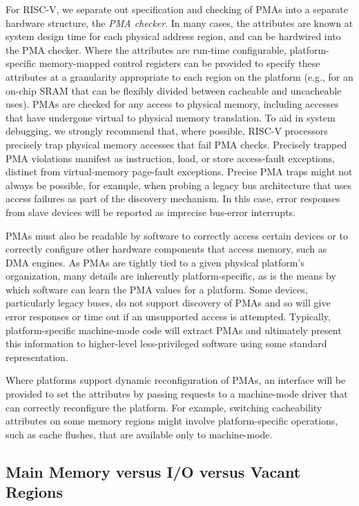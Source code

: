 For RISC-V, we separate out specification and checking of PMAs into a
separate hardware structure, the {\em PMA checker}.  In many cases,
the attributes are known at system design time for each physical
address region, and can be hardwired into the PMA checker.  Where the
attributes are run-time configurable, platform-specific memory-mapped
control registers can be provided to specify these attributes at a
granularity appropriate to each region on the platform (e.g., for an
on-chip SRAM that can be flexibly divided between cacheable and
uncacheable uses).  PMAs are checked for any access to physical
memory, including accesses that have undergone virtual to physical
memory translation.  To aid in system debugging, we strongly recommend
that, where possible, RISC-V processors precisely trap physical memory
accesses that fail PMA checks.  Precisely trapped PMA violations manifest
as instruction, load, or store access-fault exceptions, distinct from
virtual-memory page-fault exceptions. Precise PMA traps might not always be
possible, for example, when probing a legacy bus architecture that
uses access failures as part of the discovery mechanism.  In this
case, error responses from slave devices will be reported as imprecise
bus-error interrupts.

PMAs must also be readable by software to correctly access certain
devices or to correctly configure other hardware components that
access memory, such as DMA engines.  As PMAs are tightly tied to a
given physical platform's organization, many details are inherently
platform-specific, as is the means by which software can learn the PMA
values for a platform.  Some
devices, particularly legacy buses, do not support discovery of PMAs
and so will give error responses or time out if an unsupported access
is attempted.  Typically, platform-specific machine-mode code will
extract PMAs and ultimately present this information to higher-level
less-privileged software using some standard representation.

Where platforms support dynamic reconfiguration of PMAs, an interface
will be provided to set the attributes by passing requests to a
machine-mode driver that can correctly reconfigure the platform.  For
example, switching cacheability attributes on some memory regions
might involve platform-specific operations, such as cache flushes,
that are available only to machine-mode.

\subsection{Main Memory versus I/O versus Vacant Regions}

